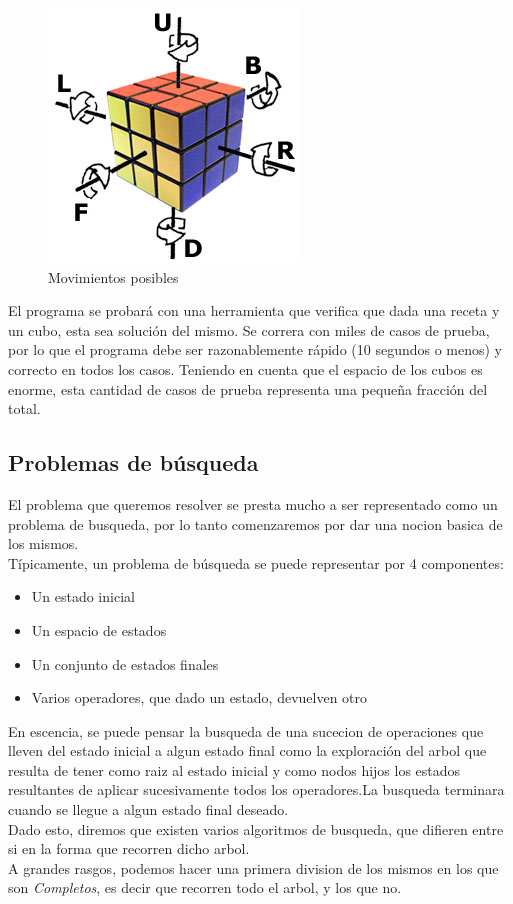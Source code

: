 \documentclass[11pt,a4paper]{article}
\begin{document}
\begin{figure}
  \centering
    \includegraphics{img/giros}
  \caption{Movimientos posibles}
  \label{fig:ejemplo}
\end{figure}

El programa se probará con una herramienta que verifica que dada una receta y un cubo, esta sea solución del mismo. Se correra con miles de casos de prueba, por lo que el programa debe ser razonablemente rápido (10 segundos o menos) y correcto en todos los casos. Teniendo en cuenta que el espacio de los cubos es enorme, esta cantidad de casos de prueba representa una pequeña fracción del total.


\subsection{Problemas de búsqueda}
El problema que queremos resolver se presta mucho a ser representado como un problema de busqueda, por lo tanto comenzaremos por dar una nocion basica de los mismos. \\
Típicamente, un problema de búsqueda se puede representar por 4 componentes:
\begin{itemize}
\item Un estado inicial
\item Un espacio de estados
\item Un conjunto de estados finales 
\item Varios operadores, que dado un estado, devuelven otro
\end{itemize}
En escencia, se puede pensar la busqueda de una sucecion de operaciones que lleven del estado inicial a algun estado final como la exploración del arbol que resulta de tener como raiz al estado inicial y como nodos hijos los estados resultantes de aplicar sucesivamente todos los operadores.La busqueda terminara cuando se llegue a algun estado final deseado.\\
Dado esto, diremos que existen varios algoritmos de busqueda, que difieren entre si en la forma que recorren dicho arbol.\\
A grandes rasgos, podemos hacer una primera division de los mismos en los que son \emph{Completos}, es decir que recorren todo el arbol, y los que no.\\
\end{document}
